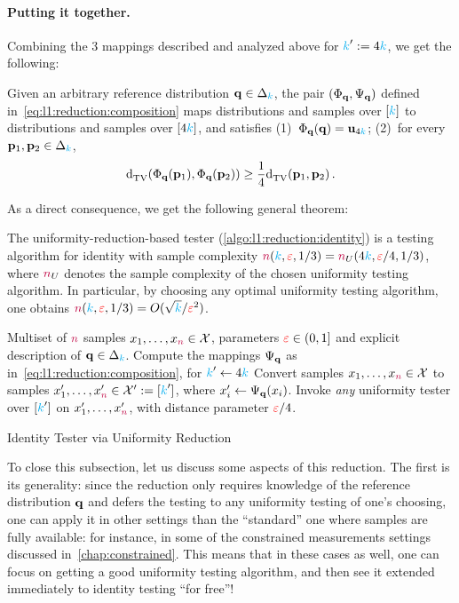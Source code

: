 \paragraph{Putting it together.} Combining the 3 mappings described and analyzed above for ${\textcolor{cyan}{k}}':= 4{\textcolor{cyan}{k}}$, we get the following:
\begin{theorem}
	Given an arbitrary reference distribution $\mathbf{q}\in\Delta_{{\textcolor{cyan}{k}}}$, the pair $(\Phi_{\mathbf{q}},\Psi_{\mathbf{q}})$ defined in~\cref{eq:l1:reduction:composition} maps distributions and samples over $[{\textcolor{cyan}{k}}]$ to distributions and samples over $[4{\textcolor{cyan}{k}}]$, and satisfies
	(1)~$\Phi_{\mathbf{q}}(\mathbf{q}) = \mathbf{u}_{ 4{\textcolor{cyan}{k}} } $;
	(2)~for every $\mathbf{p}_1,\mathbf{p}_2\in\Delta_{{\textcolor{cyan}{k}}}$, 
	\[
		\totalvardist{\Phi_\q(\p_1)}{\Phi_\q(\p_2)}\geq \frac{1}{4}\totalvardist{\p_1}{\p_2}\,.
	\]
\end{theorem}
As a direct consequence, we get the following general theorem:
\begin{theorem}
  \label{theo:l1:reduction}
The uniformity-reduction-based tester (\cref{algo:l1:reduction:identity}) is a testing algorithm for identity with sample complexity ${\textcolor{purple}{n}}({\textcolor{cyan}{k}},\textcolor{red}{\varepsilon},1/3) = {\textcolor{purple}{n}}_U(4{\textcolor{cyan}{k}},\textcolor{red}{\varepsilon}/4,1/3)$, where ${\textcolor{purple}{n}}_U$ denotes the sample complexity of the chosen uniformity testing algorithm. In particular, by choosing any optimal uniformity testing algorithm, one obtains ${\textcolor{purple}{n}}({\textcolor{cyan}{k}},\textcolor{red}{\varepsilon},1/3) = O(\sqrt{{\textcolor{cyan}{k}}}/\textcolor{red}{\varepsilon}^2)$.
\end{theorem}
\begin{algorithm}[ht!]
  \begin{algorithmic}[1]
    \Require Multiset of ${\textcolor{purple}{n}}$ samples $x_1,\dots,x_{\textcolor{purple}{n}} \in \mathcal{X}$, parameters $\textcolor{red}{\varepsilon}\in(0,1]$ and explicit description of $\mathbf{q}\in\Delta_{{\textcolor{cyan}{k}}}$.
    \State Compute the mappings $\Psi_{\mathbf{q}}$ as in~\cref{eq:l1:reduction:composition}, for ${\textcolor{cyan}{k}}'\gets 4{\textcolor{cyan}{k}}$
    \State Convert samples $x_1,\dots,x_{\textcolor{purple}{n}} \in \mathcal{X}$ to samples $x'_1,\dots,x'_{\textcolor{purple}{n}} \in \mathcal{X}' := [{\textcolor{cyan}{k}}']$, where $x'_i \gets \Psi_{\mathbf{q}}(x_i)$. 
    \State\label{algo:l1:reduction:identity:choice} Invoke \emph{any} uniformity tester over $[{\textcolor{cyan}{k}}']$ on $x'_1,\dots,x'_{\textcolor{purple}{n}}$, with distance parameter $\textcolor{red}{\varepsilon}/4$.
     \Return \reject {}
    \Else\ 
      \Return \accept {}
    \EndIf
  \end{algorithmic}
  \caption{\label{algo:l1:reduction:identity}\sc Identity Tester via Uniformity Reduction}
\end{algorithm}
To close this subsection, let us discuss some aspects of this reduction. The first is its generality: since the reduction only requires knowledge of the reference distribution $\mathbf{q}$ and defers the testing to any uniformity testing of one's choosing, one can apply it in other settings than the ``standard'' one where samples are fully available: for instance, in some of the constrained measurements settings discussed in~\cref{chap:constrained}. This means that in these cases as well, one can focus on getting a good uniformity testing algorithm, and then see it extended immediately to identity testing ``for free''!

